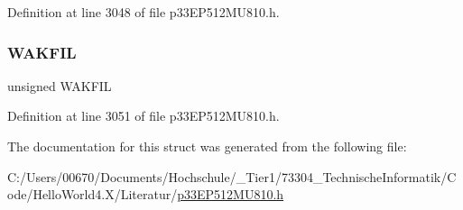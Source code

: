 Definition at line 3048 of file p33\+E\+P512\+M\+U810.\+h.

\mbox{\label{structtag_c1_c_f_g2_b_i_t_s_ab2a0670f9689af2dafc7a8239d64d820}} 
\subsubsection{\texorpdfstring{W\+A\+K\+F\+IL}{WAKFIL}}
{\footnotesize\ttfamily unsigned W\+A\+K\+F\+IL}



Definition at line 3051 of file p33\+E\+P512\+M\+U810.\+h.



The documentation for this struct was generated from the following file\+:\begin{DoxyCompactItemize}
\item 
C\+:/\+Users/00670/\+Documents/\+Hochschule/\+\_\+\+Tier1/73304\+\_\+\+Technische\+Informatik/\+Code/\+Hello\+World4.\+X/\+Literatur/\hyperlink{p33_e_p512_m_u810_8h}{p33\+E\+P512\+M\+U810.\+h}\end{DoxyCompactItemize}
